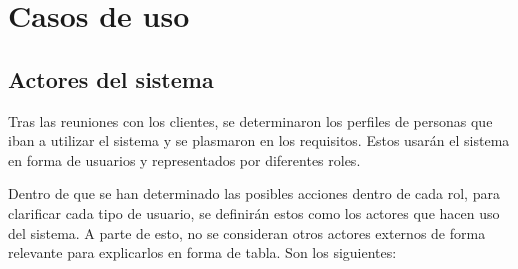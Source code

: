 \section{Casos de uso}

\subsection{Actores del sistema}

Tras las reuniones con los clientes, se determinaron los perfiles de personas que iban a utilizar el sistema y se plasmaron en los requisitos. Estos usarán el sistema en forma de usuarios y representados por diferentes roles.

Dentro de que se han determinado las posibles acciones dentro de cada rol, para clarificar cada tipo de usuario, se definirán estos como los actores que hacen uso del sistema. A parte de esto, no se consideran otros actores externos de forma relevante para explicarlos en forma de tabla. Son los siguientes: 

